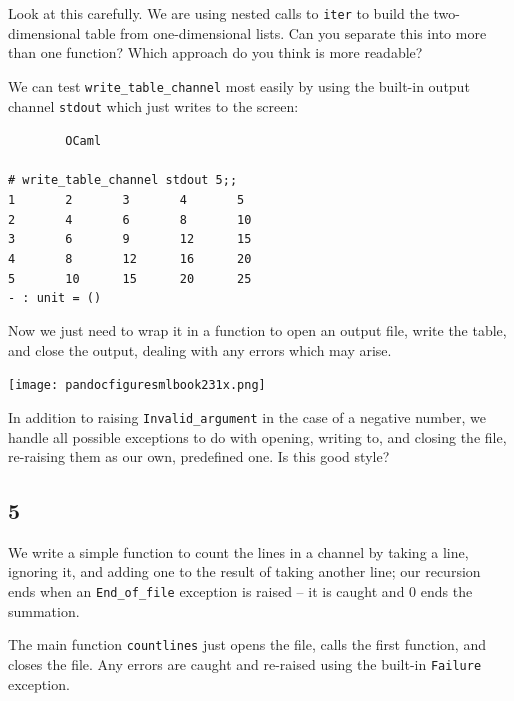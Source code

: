 \documentclass[]{book}
\newcommand{\smspace}{\vspace{4mm}}
\begin{document}
\noindent Look at this carefully. We are using nested calls to \texttt{iter} to build the two-dimensional table from one-dimensional lists. Can you separate this into more than one function? Which approach do you think is more readable?

We can test \texttt{write\_table\_channel} most easily by using the built-in output channel \texttt{stdout} which just writes to the screen:

\smspace
\noindent\verb!        OCaml!\\
\noindent\\
\noindent\verb!# write_table_channel stdout 5;;!\\
\noindent\verb!1       2       3       4       5!\\
\noindent\verb!2       4       6       8       10!\\
\noindent\verb!3       6       9       12      15!\\
\noindent\verb!4       8       12      16      20!\\
\noindent\verb!5       10      15      20      25!\\
\noindent\verb!- : unit = ()!\vphantom{g}
\smspace

\noindent Now we just need to wrap it in a function to open an output file, write the table, and close the output, dealing with any errors which may arise.

\medskip
\begin{center}
\noindent\texttt{[image: pandocfiguresmlbook231x.png]}
\end{center}
\medskip

\noindent In addition to raising \texttt{Invalid\_argument} in the case of a negative number, we handle all possible exceptions to do with opening, writing to, and closing the file, re-raising them as our own, predefined one. Is this good style?

\subsection*{5}
We write a simple function to count the lines in a channel by taking a line, ignoring it, and adding one to the result of taking another line; our recursion ends when an \texttt{End\_of\_file} exception is raised -- it is caught and $0$ ends the summation.

The main function \texttt{countlines} just opens the file, calls the first function, and closes the file. Any errors are caught and re-raised using the built-in \texttt{Failure} exception.
\end{document}
